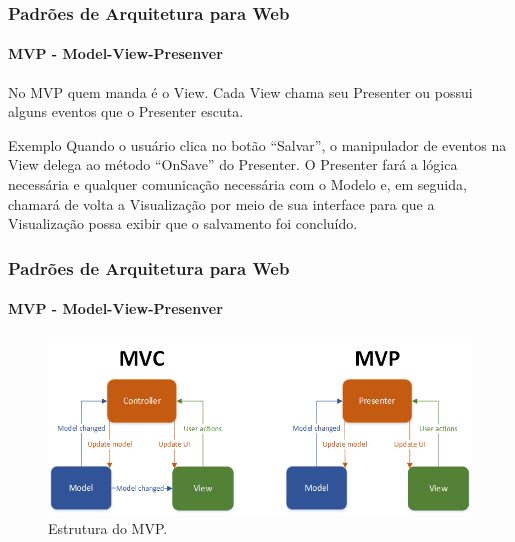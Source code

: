 \documentclass[
	10pt, %
	t, %
]{beamer}
\begin{document}
\begin{frame}
	\frametitle{Padrões de Arquitetura para Web}
	\framesubtitle{MVP - Model-View-Presenver}

	No MVP quem manda é o View. Cada View chama seu Presenter ou possui alguns eventos que o Presenter escuta.
	\begin{exampleblock}{Exemplo}
		Quando o usuário clica no botão “Salvar”, o manipulador de eventos na View delega ao método “OnSave” do Presenter. O Presenter fará a lógica necessária e qualquer comunicação necessária com o Modelo e, em seguida, chamará de volta a Visualização por meio de sua interface para que a Visualização possa exibir que o salvamento foi concluído.
	\end{exampleblock}

	
\end{frame}

\begin{frame}
	\frametitle{Padrões de Arquitetura para Web}
	\framesubtitle{MVP - Model-View-Presenver}

	\begin{figure}
		\centering
		\includegraphics[width=0.9\linewidth]{Images/mvc_mvp.png}
		\caption{Estrutura do MVP.}\label{fig:mvp}
	\end{figure}

\end{frame}
\end{document}
